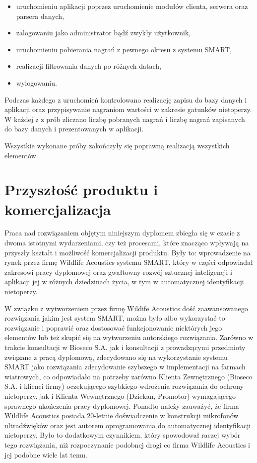 \documentclass{sprz}
\begin{document}
\begin{itemize}
  \item uruchomieniu aplikacji poprzez uruchomienie modułów clienta, serwera oraz parsera danych,
  \item zalogowaniu jako administrator bądź zwykły użytkownik,
  \item uruchomieniu pobierania nagrań z pewnego okresu z systemu SMART,
  \item realizacji filtrowania danych po różnych datach,
  \item wylogowaniu.
\end{itemize}

Podczas każdego z uruchomień kontrolowano realizację zapisu do bazy danych i aplikacji oraz przypisywanie nagraniom wartości w zakresie gatunków nietoperzy.
W każdej z z prób zliczano liczbę pobranych nagrań i liczbę nagrań zapisanych do bazy danych i prezentowanych w aplikacji.


Wszystkie wykonane próby zakończyły się poprawną realizacją wszystkich elementów.

\chapter{Przyszłość produktu i komercjalizacja}

Praca nad rozwiązaniem objętym niniejszym dyplomem zbiegła się w czasie z dwoma istotnymi wydarzeniami, czy też procesami, które znacząco wpływają na przyszły kształt i możliwość komercjalizacji produktu. Były to: wprowadzenie na rynek przez firmę Wildlife Acoustics systemu SMART, który w części odpowiadał zakresowi pracy dyplomowej oraz gwałtowny rozwój sztucznej inteligencji i aplikacji jej w różnych dziedzinach życia, w tym w automatycznej identyfikacji nietoperzy.

W związku z wytworzeniem przez firmę Wildife Acoustics dość zaawansowanego rozwiązania jakim jest system SMART, można było albo wykorzystać to rozwiązanie i poprawić oraz dostosować funkcjonowanie niektórych jego elementów lub też skupić się na wytworzeniu autorskiego rozwiązania. Zarówno w trakcie konsultacji w Bioseco S.A. jak i konsultacji z prowadzącymi przedmioty związane z pracą dyplomową, zdecydowano się na wykorzystanie systemu SMART jako rozwiązania zdecydowanie szybszego w implementacji na farmach wiatrowych, co odpowiadało na potrzeby zarówno Klienta Zewnętrznego (Bioseco S.A. i klienci firmy) oczekującego szybkiego wdrożenia rozwiązania do ochrony nietoperzy, jak i Klienta Wewnętrznego (Dziekan, Promotor) wymagającego sprawnego ukończenia pracy dyplomowej.
Ponadto należy zauważyć, że firma Wildlife Acoustics posiada 20-letnie doświadczenie w konstrukcji mikrofonów ultradźwięków oraz jest autorem oprogramowania do automatycznej identyfikacji nietoperzy. Było to dodatkowym czynnikiem, który spowodował raczej wybór tego rozwiązania, niż rozpoczynanie podobnej drogi co firma Wildlife Acoustics i jej podobne wiele lat temu.
\end{document}

